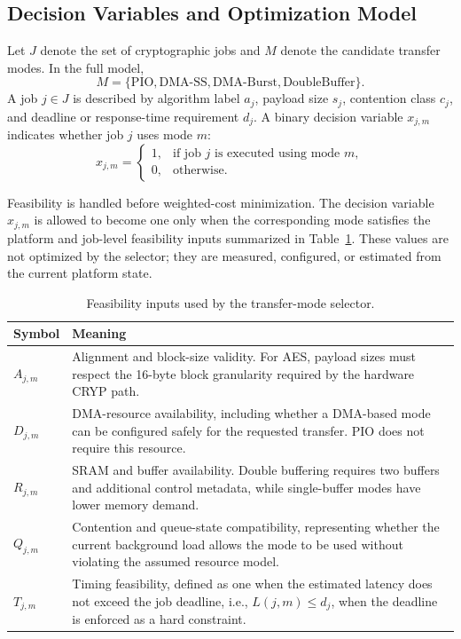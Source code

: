 \documentclass[conference]{IEEEtran}
\begin{document}
\subsection{Decision Variables and Optimization Model}
Let $J$ denote the set of cryptographic jobs and $M$ denote the candidate transfer modes. In the full model,
\begin{equation}
M = \{\text{PIO}, \text{DMA-SS}, \text{DMA-Burst}, \text{DoubleBuffer}\}.
\end{equation}
A job $j \in J$ is described by algorithm label $a_j$, payload size $s_j$, contention class $c_j$, and deadline or response-time requirement $d_j$. A binary decision variable $x_{j,m}$ indicates whether job $j$ uses mode $m$:
\begin{equation}
x_{j,m} = \begin{cases}
1, & \text{if job } j \text{ is executed using mode } m,\\
0, & \text{otherwise.}
\end{cases}
\end{equation}

Feasibility is handled before weighted-cost minimization. The decision variable $x_{j,m}$ is allowed to become one only when the corresponding mode satisfies the platform and job-level feasibility inputs summarized in Table~\ref{tab:feasibility_inputs}. These values are not optimized by the selector; they are measured, configured, or estimated from the current platform state.

\begin{table}[ht!]
\centering
\caption{Feasibility inputs used by the transfer-mode selector.}
\label{tab:feasibility_inputs}
\begin{tabularx}{\linewidth}{@{}lX@{}}
\toprule
Symbol & Meaning \\
\midrule
$A_{j,m}$ & Alignment and block-size validity. For AES, payload sizes must respect the 16-byte block granularity required by the hardware CRYP path. \\
$D_{j,m}$ & DMA-resource availability, including whether a DMA-based mode can be configured safely for the requested transfer. PIO does not require this resource. \\
$R_{j,m}$ & SRAM and buffer availability. Double buffering requires two buffers and additional control metadata, while single-buffer modes have lower memory demand. \\
$Q_{j,m}$ & Contention and queue-state compatibility, representing whether the current background load allows the mode to be used without violating the assumed resource model. \\
$T_{j,m}$ & Timing feasibility, defined as one when the estimated latency does not exceed the job deadline, i.e., $L(j,m) \leq d_j$, when the deadline is enforced as a hard constraint. \\
\bottomrule
\end{tabularx}
\end{table}
\end{document}
